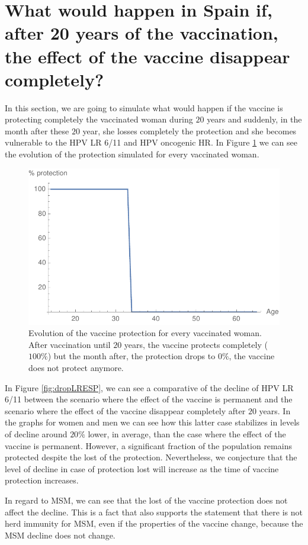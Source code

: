 \section{What would happen in Spain if, after 20 years of the vaccination, the effect of the vaccine disappear completely?}
In this section, we are going to simulate what would happen if the vaccine is protecting completely the vaccinated woman during $20$ years and suddenly, in the month after these $20$ year, she losses completely the protection and she becomes vulnerable to the HPV LR 6/11 and HPV oncogenic HR. In Figure \ref{fig:perdida_proteccion} we can see the evolution of the protection simulated for every vaccinated woman.

\begin{figure}[h!]
	\centering
	\includegraphics[width=0.5\linewidth]{IMGs/6.-Caida_brusca/grafica_perdida_proteccion.pdf}
	\caption{Evolution of the vaccine protection for every vaccinated woman. After vaccination until $20$ years, the vaccine protects completely ($100\%$) but the month after, the protection drops to $0\%$, the vaccine does not protect anymore.}
	\label{fig:perdida_proteccion}
\end{figure}

In Figure \ref{fig:dropLRESP}, we can see a comparative of the decline of HPV LR 6/11 between the scenario where the effect of the vaccine is permanent and the scenario where the effect of the vaccine disappear completely after $20$ years. In the graphs for women and men we can see how this latter case stabilizes in levels of decline around $20\%$ lower, in average, than the case where the effect of the vaccine is permanent. However, a significant fraction of the population remains protected despite the lost of the protection. Nevertheless, we conjecture that the level of decline in case of protection lost will increase as the time of vaccine protection increases. 

In regard to MSM, we can see that the lost of the vaccine protection does not affect the decline. This is a fact that also supports the statement that there is not herd immunity for MSM, even if the properties of the vaccine change, because the MSM decline does not change.


